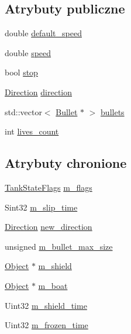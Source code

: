 \subsection*{Atrybuty publiczne}
\begin{DoxyCompactItemize}
\item 
double \hyperlink{class_tank_acd370abc3ccd4c67c8285e42884c7b1c}{default\+\_\+speed}
\item 
double \hyperlink{class_tank_a4c19847eec64e4d3793885150145aa93}{speed}
\item 
bool \hyperlink{class_tank_a4134e3bc03ed6453f1e76f161f29a657}{stop}
\item 
\hyperlink{type_8h_a224b9163917ac32fc95a60d8c1eec3aa}{Direction} \hyperlink{class_tank_a316c67f799b64265a676038da73b0676}{direction}
\item 
std\+::vector$<$ \hyperlink{class_bullet}{Bullet} $\ast$ $>$ \hyperlink{class_tank_a85d5a28cc0e589748644bdf2879745cb}{bullets}
\item 
int \hyperlink{class_tank_abb0e870d0f5ecdb44adf6c1136536822}{lives\+\_\+count}
\end{DoxyCompactItemize}
\subsection*{Atrybuty chronione}
\begin{DoxyCompactItemize}
\item 
\hyperlink{tank_8h_a7109342eb8cc7d8bbf8b6309ebcb4669}{Tank\+State\+Flags} \hyperlink{class_tank_a20c5abbc8ee4901444f0fc1c9fd46eb1}{m\+\_\+flags}
\item 
Sint32 \hyperlink{class_tank_aee43131c389c141d21ac58f3a6dbb025}{m\+\_\+slip\+\_\+time}
\item 
\hyperlink{type_8h_a224b9163917ac32fc95a60d8c1eec3aa}{Direction} \hyperlink{class_tank_a4411d9cf4dd459296b320e36d08e7f12}{new\+\_\+direction}
\item 
unsigned \hyperlink{class_tank_a2a6fb83df6ad84e8b3145f36d25b0ced}{m\+\_\+bullet\+\_\+max\+\_\+size}
\item 
\hyperlink{class_object}{Object} $\ast$ \hyperlink{class_tank_a19dc0d8574c701ea45c3ba7c610c5aa4}{m\+\_\+shield}
\item 
\hyperlink{class_object}{Object} $\ast$ \hyperlink{class_tank_afc71fe83709cbe9df5413f04213a5a3b}{m\+\_\+boat}
\item 
Uint32 \hyperlink{class_tank_ad6f78705b79f5570f403dea866c970f8}{m\+\_\+shield\+\_\+time}
\item 
Uint32 \hyperlink{class_tank_a98f872a3bd144261ca25569091be8ab6}{m\+\_\+frozen\+\_\+time}
\end{DoxyCompactItemize}
